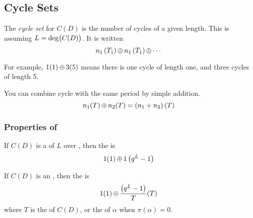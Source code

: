 \subsection{Cycle Sets}\label{subsec:Cycle_Sets}
\begin{definition}\label{def:Cycle_Set}
  The \emph{cycle set} for $C(D)$ is the number of cycles of a given length.
  This is assuming $L = \operatorname{\operatorname{deg}} \bigl( C(D) \bigr)$.
  It is written
  \begin{equation}\label{eq:Cycle_Set}
    n_{1} \left( T_{1} \right) \operatorname{\oplus} n_{1} \left( T_{1} \right) \operatorname{\oplus} \cdots
  \end{equation}

  For example, $1(1) \operatorname{\oplus} 3(5)$ means there is one cycle of length one, and three cycles of length 5.

  \begin{remark}[Combining]
    You can combine cycle with the same period by simple addition.
    \begin{equation}\label{eq:Cycle_Set_Addition}
      n_{1}(T) \operatorname{\oplus} n_{2}(T) =  \left( n_{1} + n_{2} \right) (T)
    \end{equation}
  \end{remark}
\end{definition}

\subsubsection{Properties of }\label{subsubsec:Cycle_Set_Properties}
\begin{propertylist}
\item If $C(D)$ is a  of  $L$ over , then the  is\label{prop:Cycle_Set_Properties-Primitive_Polynomial}
  \begin{equation}\label{eq:Primitive_Polynomial_Cycle_Set}
    1(1) \operatorname{\oplus} 1 \left( q^{L}-1 \right)
  \end{equation}
\item If $C(D)$ is an  , then the  is\label{prop:Cycle_Set_Properties-Irreducible_Polynomial}
  \begin{equation}\label{eq:Irreducible_Polynomial_Cycle_Set}
    1(1) \operatorname{\oplus} \frac{ \left(q^{L} - 1 \right)}{T} (T)
  \end{equation}
  where $T$ is the  of $C(D)$, or the  of $\alpha$ when $\pi(\alpha)=0$.
\end{propertylist}

